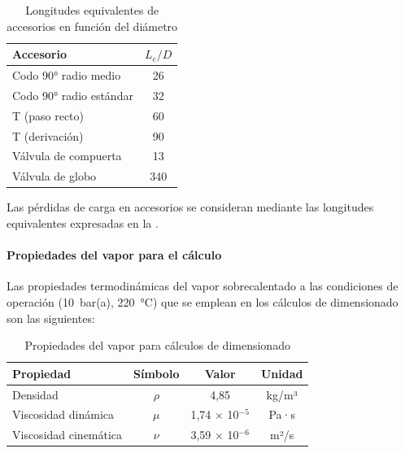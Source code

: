 \documentclass[12pt]{article}
\begin{document}
\begin{table}[H]
	\centering
	\caption{Longitudes equivalentes de accesorios en función del diámetro}
	\label{tab:longitudes-equivalentes}
	\begin{tabular}{lc}
		\toprule
		\textbf{Accesorio}      & \textbf{$L_e/D$} \\
		\midrule
		Codo 90° radio medio    & 26               \\
		Codo 90° radio estándar & 32               \\
		T (paso recto)          & 60               \\
		T (derivación)          & 90               \\
		Válvula de compuerta    & 13               \\
		Válvula de globo        & 340              \\
		\bottomrule
	\end{tabular}
\end{table}

Las pérdidas de carga en accesorios se consideran mediante las longitudes equivalentes expresadas en la .

\paragraph{Propiedades del vapor para el cálculo}

Las propiedades termodinámicas del vapor sobrecalentado a las condiciones de operación (10~bar(a), 220~°C) que se emplean en los cálculos de dimensionado son las siguientes:

\begin{table}[H]
	\centering
	\caption{Propiedades del vapor para cálculos de dimensionado}
	\label{tab:propiedades-vapor-dimensionado}
	\begin{tabular}{lccc}
		\toprule
		\textbf{Propiedad}    & \textbf{Símbolo} & \textbf{Valor}          & \textbf{Unidad} \\
		\midrule
		Densidad              & $\rho$           & 4,85                    & kg/m³           \\
		Viscosidad dinámica   & $\mu$            & 1,74 $\times$ 10$^{-5}$ & Pa·s            \\
		Viscosidad cinemática & $\nu$            & 3,59 $\times$ 10$^{-6}$ & m²/s            \\
		\bottomrule
	\end{tabular}
\end{table}
\end{document}
